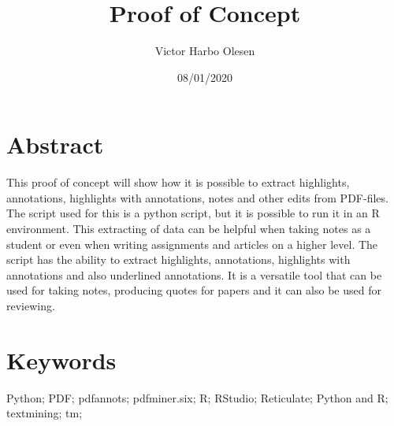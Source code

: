 \documentclass{article}
\title{Proof of Concept}
\author{Victor Harbo Olesen}
\date{08/01/2020}
\begin{document}
\maketitle

\section{Abstract}
This proof of concept will show how it is possible to extract highlights, annotations, highlights with annotations, notes and other edits from PDF-files. The script used for this is a python script, but it is possible to run it in an R environment. This extracting of data can be helpful when taking notes as a student or even when writing assignments and articles on a higher level. The script has the ability to extract highlights, annotations, highlights with annotations and also underlined annotations. It is a versatile tool that can be used for taking notes, producing quotes for papers and it can also be used for reviewing.
\section{Keywords}
Python; PDF; pdfannots; pdfminer.six; R; RStudio; Reticulate; Python and R; textmining; tm; 
\end{document}
